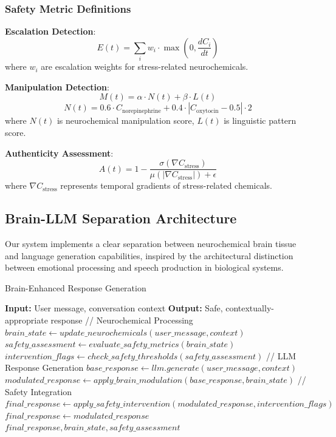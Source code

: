 \documentclass[12pt]{article}
\begin{document}
\subsubsection{Safety Metric Definitions}

\textbf{Escalation Detection}:
\begin{equation}
E(t) = \sum_i w_i \cdot \max(0, \frac{dC_i}{dt})
\end{equation}
where $w_i$ are escalation weights for stress-related neurochemicals.

\textbf{Manipulation Detection}:
\begin{equation}
M(t) = \alpha \cdot N(t) + \beta \cdot L(t)
\end{equation}
\begin{equation}
N(t) = 0.6 \cdot C_{\text{norepinephrine}} + 0.4 \cdot |C_{\text{oxytocin}} - 0.5| \cdot 2
\end{equation}
where $N(t)$ is neurochemical manipulation score, $L(t)$ is linguistic pattern score.

\textbf{Authenticity Assessment}:
\begin{equation}
A(t) = 1 - \frac{\sigma(\nabla C_{\text{stress}})}{\mu(|\nabla C_{\text{stress}}|) + \epsilon}
\end{equation}
where $\nabla C_{\text{stress}}$ represents temporal gradients of stress-related chemicals.

\subsection{Brain-LLM Separation Architecture}

Our system implements a clear separation between neurochemical brain tissue and language generation capabilities, inspired by the architectural distinction between emotional processing and speech production in biological systems.

\begin{algorithm}
\caption{Brain-Enhanced Response Generation}
\begin{algorithmic}
\STATE \textbf{Input:} User message, conversation context
\STATE \textbf{Output:} Safe, contextually-appropriate response
\STATE
\STATE // Neurochemical Processing
\STATE $brain\_state \leftarrow update\_neurochemicals(user\_message, context)$
\STATE $safety\_assessment \leftarrow evaluate\_safety\_metrics(brain\_state)$
\STATE $intervention\_flags \leftarrow check\_safety\_thresholds(safety\_assessment)$
\STATE
\STATE // LLM Response Generation
\STATE $base\_response \leftarrow llm.generate(user\_message, context)$
\STATE $modulated\_response \leftarrow apply\_brain\_modulation(base\_response, brain\_state)$
\STATE
\STATE // Safety Integration
    \STATE $final\_response \leftarrow apply\_safety\_intervention(modulated\_response, intervention\_flags)$
\ELSE
    \STATE $final\_response \leftarrow modulated\_response$
\ENDIF
\STATE
\RETURN $final\_response, brain\_state, safety\_assessment$
\end{algorithmic}
\end{algorithm}
\end{document}

